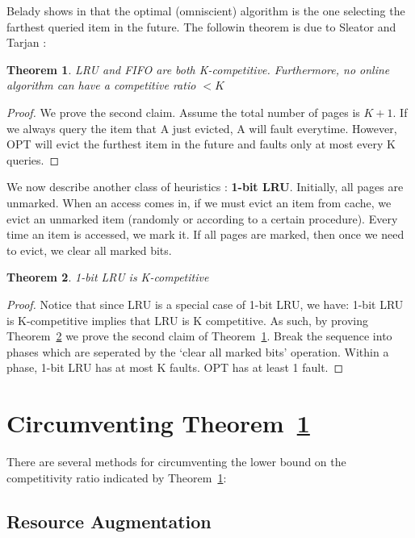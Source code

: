 \documentclass[11pt]{article}
\newtheorem{theorem}{Theorem}
\begin{document}
Belady shows in \cite{BE66} that the optimal (omniscient) algorithm is the one selecting the farthest queried item in the future. The followin theorem is due to Sleator and Tarjan \cite{SJ85}:

\begin{theorem}
\label{th:lrufifo}
LRU and FIFO are both K-competitive. Furthermore, no online algorithm can have a competitive ratio $< K$
\end{theorem}

\begin{proof}
We prove the second claim. Assume the total number of pages is $K+1$. If we always query the item that A just evicted, A will fault everytime. However, OPT will evict the furthest item in the future and faults only at most every K queries.
\end{proof}

We now describe another class of heuristics : {\bf 1-bit LRU}. Initially, all pages are unmarked. When an access comes in, if we must evict an item from cache, we evict an unmarked item (randomly or according to a certain procedure). Every time an item is accessed, we mark it. If all pages are marked, then once we need to evict, we clear all marked bits.
\begin{theorem}
\label{th:1bitlru}
1-bit LRU is K-competitive
\end{theorem}

\begin{proof}
Notice that since LRU is a special case of 1-bit LRU, we have: 1-bit LRU is K-competitive implies that LRU is K competitive. As such, by proving Theorem~\ref{th:1bitlru} we prove the second claim of Theorem~\ref{th:lrufifo}. Break the sequence into phases which are seperated by the `clear all marked bits' operation. Within a phase, 1-bit LRU has at most K faults. OPT has at least 1 fault.
\end{proof}

\section{Circumventing Theorem~\ref{th:lrufifo}}

There are several methods for circumventing the lower bound on the competitivity ratio indicated by Theorem~\ref{th:lrufifo}:

\subsection{Resource Augmentation}
\end{document}
